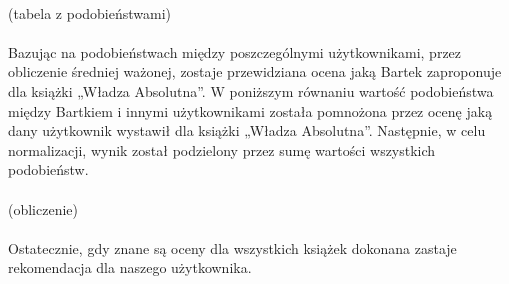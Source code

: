 \documentclass[12pt,a4paper]{report}
\begin{document}
\\(tabela z podobieństwami)
\\
\\Bazując na podobieństwach między poszczególnymi użytkownikami, przez obliczenie średniej ważonej, zostaje przewidziana ocena jaką Bartek zaproponuje dla książki „Władza Absolutna”. W poniższym równaniu wartość podobieństwa między Bartkiem i innymi użytkownikami została pomnożona przez ocenę jaką dany użytkownik wystawił dla książki „Władza Absolutna”. Następnie, w celu normalizacji, wynik został podzielony przez sumę wartości wszystkich podobieństw.
\\
\\(obliczenie)
\\
\\Ostatecznie, gdy znane są oceny dla wszystkich książek dokonana zastaje rekomendacja dla naszego użytkownika.
\\
\\
\end{document}
